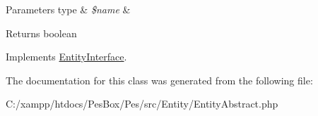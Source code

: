 \begin{DoxyParams}[1]{Parameters}
type & {\em \$name} & \\
\hline
\end{DoxyParams}
\begin{DoxyReturn}{Returns}
boolean 
\end{DoxyReturn}


Implements \mbox{\hyperlink{interface_pes_1_1_entity_1_1_entity_interface}{Entity\+Interface}}.



The documentation for this class was generated from the following file\+:\begin{DoxyCompactItemize}
\item 
C\+:/xampp/htdocs/\+Pes\+Box/\+Pes/src/\+Entity/Entity\+Abstract.\+php\end{DoxyCompactItemize}
